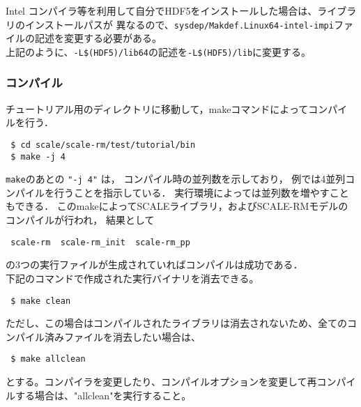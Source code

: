 Intel コンパイラ等を利用して自分でHDF5をインストールした場合は、ライブラリのインストールパスが
異なるので、\verb"sysdep/Makdef.Linux64-intel-impi"ファイルの記述を変更する必要がある。
\\
上記のように、\verb"-L$(HDF5)/lib64"の記述を\verb"-L$(HDF5)/lib"に変更する。


\subsubsection{コンパイル}

チュートリアル用のディレクトリに移動して，makeコマンドによってコンパイルを行う．
\begin{verbatim}
 $ cd scale/scale-rm/test/tutorial/bin
 $ make -j 4
\end{verbatim}
\verb|make|のあとの \verb|"-j 4"| は，
コンパイル時の並列数を示しており，
例では4並列コンパイルを行うことを指示している．
実行環境によっては並列数を増やすこともできる．
このmakeによってSCALEライブラリ，およびSCALE-RMモデルのコンパイルが行われ，
結果として
\begin{verbatim}
 scale-rm  scale-rm_init  scale-rm_pp
\end{verbatim}
の3つの実行ファイルが生成されていればコンパイルは成功である．\\

下記のコマンドで作成された実行バイナリを消去できる。
\begin{verbatim}
 $ make clean
\end{verbatim}
ただし、この場合はコンパイルされたライブラリは消去されないため、全てのコンパイル済みファイルを消去したい場合は、
\begin{verbatim}
 $ make allclean
\end{verbatim}
とする。コンパイラを変更したり、コンパイルオプションを変更して再コンパイルする場合は、"allclean"を実行すること。


